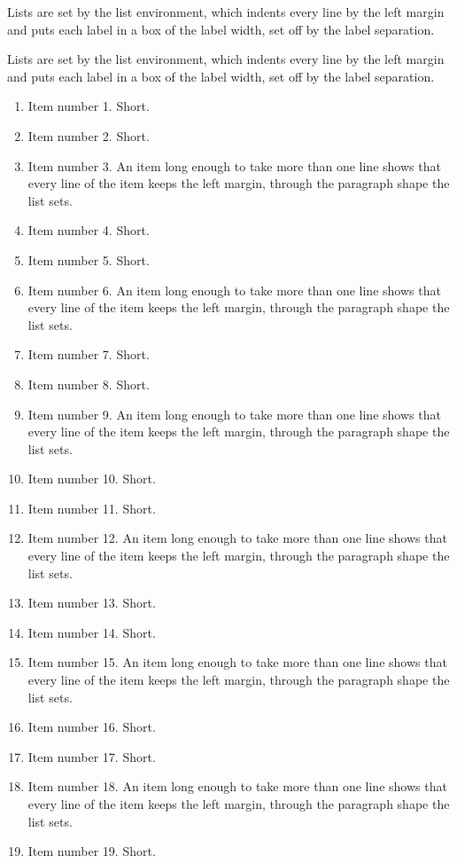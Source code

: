 \documentclass[11pt]{article}
\begin{document}
Lists are set by the list environment, which indents every line by the left margin and puts each label in a box of the label width, set off by the label separation.

Lists are set by the list environment, which indents every line by the left margin and puts each label in a box of the label width, set off by the label separation.

\begin{enumerate}
\item Item number 1. Short.
\item Item number 2. Short.
\item Item number 3. An item long enough to take more than one line shows that every line of the item keeps the left margin, through the paragraph shape the list sets.
\item Item number 4. Short.
\item Item number 5. Short.
\item Item number 6. An item long enough to take more than one line shows that every line of the item keeps the left margin, through the paragraph shape the list sets.
\item Item number 7. Short.
\item Item number 8. Short.
\item Item number 9. An item long enough to take more than one line shows that every line of the item keeps the left margin, through the paragraph shape the list sets.
\item Item number 10. Short.
\item Item number 11. Short.
\item Item number 12. An item long enough to take more than one line shows that every line of the item keeps the left margin, through the paragraph shape the list sets.
\item Item number 13. Short.
\item Item number 14. Short.
\item Item number 15. An item long enough to take more than one line shows that every line of the item keeps the left margin, through the paragraph shape the list sets.
\item Item number 16. Short.
\item Item number 17. Short.
\item Item number 18. An item long enough to take more than one line shows that every line of the item keeps the left margin, through the paragraph shape the list sets.
\item Item number 19. Short.

\end{enumerate}
\end{document}
